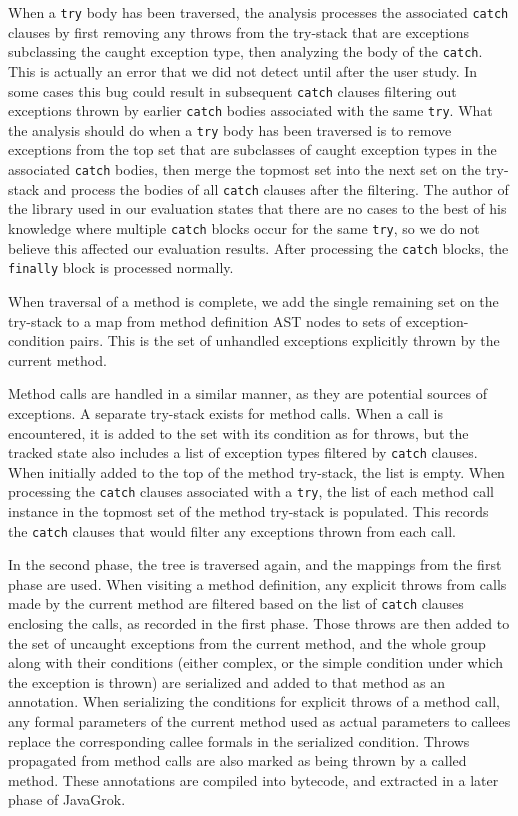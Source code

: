 When a \texttt{try} body has been traversed, the analysis processes the
associated \texttt{catch} clauses by first removing any throws from the
try-stack that are exceptions subclassing the caught exception type, then
analyzing the body of the \texttt{catch}.  This is actually an error that we did
not detect until after the user study.  In some cases this bug could result in subsequent
\texttt{catch} clauses filtering out exceptions thrown by earlier \texttt{catch}
bodies associated with the same \texttt{try}.
What the analysis should do 
when a \texttt{try} body has been traversed is to
remove exceptions from the top set that are subclasses of caught exception
types in the associated \texttt{catch} bodies,  then merge the topmost set
into the next set on the try-stack and process the bodies of
all \texttt{catch} clauses after the filtering.
The author of the library used in our evaluation states that there are no cases
to the best of his knowledge where multiple \texttt{catch} blocks occur for the
same \texttt{try}, so we do not believe this affected our evaluation results.
After processing the \texttt{catch} blocks, the \texttt{finally} block is
processed normally.

When traversal of a method is complete, we add the
single remaining set on the try-stack to a map from method definition AST
nodes to sets of exception-condition pairs.  This is the set of unhandled
exceptions explicitly thrown by the current method.

Method calls are handled in a similar manner, as they are potential sources of
exceptions.  A separate try-stack exists for method calls.  When a call is
encountered, it is added to the set with its condition as for throws, but the
tracked state also includes a list of exception types filtered by \texttt{catch} clauses.  When
initially added to the top of the method try-stack, the list is empty.  When
processing the \texttt{catch} clauses associated with a \texttt{try}, the list of each
method call instance in the topmost set of the method try-stack is populated.
This records the \texttt{catch} clauses that would filter any exceptions thrown
from each call.

In the second phase, the tree is traversed again, and the mappings from the first
phase are used.  When visiting a method definition, any explicit throws from
calls made by the current method are filtered based on the list of \texttt{catch} clauses
enclosing the calls, as recorded in the first phase.  Those throws are then added to the set of uncaught
exceptions from the current method, and the whole group along with their
conditions (either complex, or the simple condition under
which the exception is thrown) are serialized and added to that method as an
annotation.  When serializing the conditions for explicit throws of a method
call, any formal parameters of the current method used as actual parameters to
callees replace the corresponding callee formals in the serialized condition.
Throws propagated from method calls are also marked as being thrown by a called
method.
These annotations are compiled into bytecode, and extracted in a later phase of
JavaGrok.

